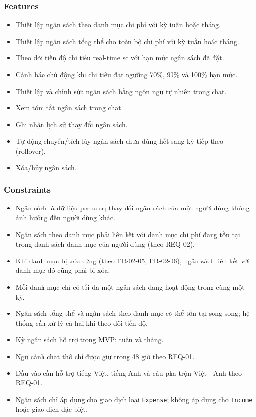\subsubsection{Features}

\begin{itemize}
\item Thiết lập ngân sách theo danh mục chi phí với kỳ tuần hoặc tháng.
\item Thiết lập ngân sách tổng thể cho toàn bộ chi phí với kỳ tuần hoặc tháng.
\item Theo dõi tiến độ chi tiêu real-time so với hạn mức ngân sách đã đặt.
\item Cảnh báo chủ động khi chi tiêu đạt ngưỡng 70\%, 90\% và 100\% hạn mức.
\item Thiết lập và chỉnh sửa ngân sách bằng ngôn ngữ tự nhiên trong chat.
\item Xem tóm tắt ngân sách trong chat.
\item Ghi nhận lịch sử thay đổi ngân sách.
\item Tự động chuyển/tích lũy ngân sách chưa dùng hết sang kỳ tiếp theo (rollover).
\item Xóa/hủy ngân sách.
\end{itemize}
\subsubsection{Constraints}

\begin{itemize}
\item Ngân sách là dữ liệu per-user; thay đổi ngân sách của một người dùng không ảnh hưởng đến người dùng khác.
\item Ngân sách theo danh mục phải liên kết với danh mục chi phí đang tồn tại trong danh sách danh mục của người dùng (theo REQ-02).
\item Khi danh mục bị xóa cứng (theo FR-02-05, FR-02-06), ngân sách liên kết với danh mục đó cũng phải bị xóa.
\item Mỗi danh mục chỉ có tối đa một ngân sách đang hoạt động trong cùng một kỳ.
\item Ngân sách tổng thể và ngân sách theo danh mục có thể tồn tại song song; hệ thống cần xử lý cả hai khi theo dõi tiến độ.
\item Kỳ ngân sách hỗ trợ trong MVP: tuần và tháng.
\item Ngữ cảnh chat thô chỉ được giữ trong 48 giờ theo REQ-01.
\item Đầu vào cần hỗ trợ tiếng Việt, tiếng Anh và câu pha trộn Việt - Anh theo REQ-01.
\item Ngân sách chỉ áp dụng cho giao dịch loại \texttt{Expense}; không áp dụng cho \texttt{Income} hoặc giao dịch đặc biệt.
\end{itemize}
